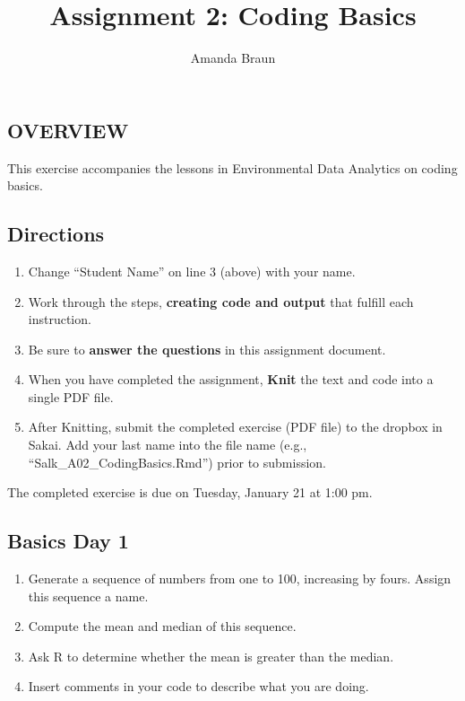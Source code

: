 \documentclass[]{article}
\title{Assignment 2: Coding Basics}
\author{Amanda Braun}
\date{}
\providecommand{\tightlist}{%
  \setlength{\itemsep}{0pt}\setlength{\parskip}{0pt}}
\begin{document}
\maketitle

\hypertarget{overview}{%
\subsection{OVERVIEW}\label{overview}}

This exercise accompanies the lessons in Environmental Data Analytics on
coding basics.

\hypertarget{directions}{%
\subsection{Directions}\label{directions}}

\begin{enumerate}
\def\labelenumi{\arabic{enumi}.}
\tightlist
\item
  Change ``Student Name'' on line 3 (above) with your name.
\item
  Work through the steps, \textbf{creating code and output} that fulfill
  each instruction.
\item
  Be sure to \textbf{answer the questions} in this assignment document.
\item
  When you have completed the assignment, \textbf{Knit} the text and
  code into a single PDF file.
\item
  After Knitting, submit the completed exercise (PDF file) to the
  dropbox in Sakai. Add your last name into the file name (e.g.,
  ``Salk\_A02\_CodingBasics.Rmd'') prior to submission.
\end{enumerate}

The completed exercise is due on Tuesday, January 21 at 1:00 pm.

\hypertarget{basics-day-1}{%
\subsection{Basics Day 1}\label{basics-day-1}}

\begin{enumerate}
\def\labelenumi{\arabic{enumi}.}
\item
  Generate a sequence of numbers from one to 100, increasing by fours.
  Assign this sequence a name.
\item
  Compute the mean and median of this sequence.
\item
  Ask R to determine whether the mean is greater than the median.
\item
  Insert comments in your code to describe what you are doing.
\end{enumerate}
\end{document}
